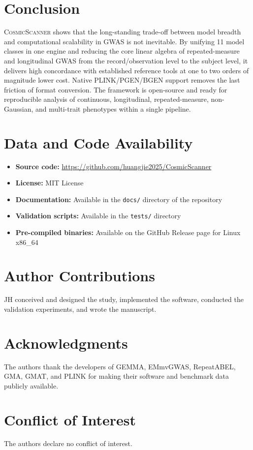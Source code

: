 \documentclass[11pt,a4paper]{article}
\newcommand{\CosmicScanner}{\textsc{CosmicScanner}}
\begin{document}
\newpage
\section{Conclusion}
\label{sec:conclusion}

\CosmicScanner{} shows that the long-standing trade-off between model breadth and computational scalability in GWAS is not inevitable. By unifying 11 model classes in one engine and reducing the core linear algebra of repeated-measure and longitudinal GWAS from the record/observation level to the subject level, it delivers high concordance with established reference tools at one to two orders of magnitude lower cost. Native PLINK/PGEN/BGEN support removes the last friction of format conversion. The framework is open-source and ready for reproducible analysis of continuous, longitudinal, repeated-measure, non-Gaussian, and multi-trait phenotypes within a single pipeline.

\section*{Data and Code Availability}

\begin{itemize}
\item \textbf{Source code:} \url{https://github.com/huangjie2025/CosmicScanner}
\item \textbf{License:} MIT License
\item \textbf{Documentation:} Available in the \texttt{docs/} directory of the repository
\item \textbf{Validation scripts:} Available in the \texttt{tests/} directory
\item \textbf{Pre-compiled binaries:} Available on the GitHub Release page for Linux x86\_64
\end{itemize}

\section*{Author Contributions}

JH conceived and designed the study, implemented the software, conducted the validation experiments, and wrote the manuscript.

\section*{Acknowledgments}

The authors thank the developers of GEMMA, EMmvGWAS, RepeatABEL, GMA, GMAT, and PLINK for making their software and benchmark data publicly available.

\section*{Conflict of Interest}

The authors declare no conflict of interest.

\newpage

\end{document}
